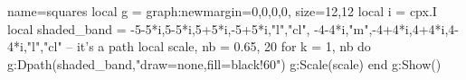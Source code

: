 \documentclass[border=5pt]{standalone}
\begin{document}
\begin{luadraw}{name=squares}
local g = graph:new{margin={0,0,0,0}, size={12,12}}
local i = cpx.I
local shaded_band = {-5-5*i,5-5*i,5+5*i,-5+5*i,"l","cl", -4-4*i,"m",-4+4*i,4+4*i,4-4*i,"l","cl"} -- it's a path
local scale, nb = 0.65, 20
for k = 1, nb do
    g:Dpath(shaded_band,"draw=none,fill=black!60")
    g:Scale(scale)
end
g:Show() 
\end{luadraw}
\end{document}
